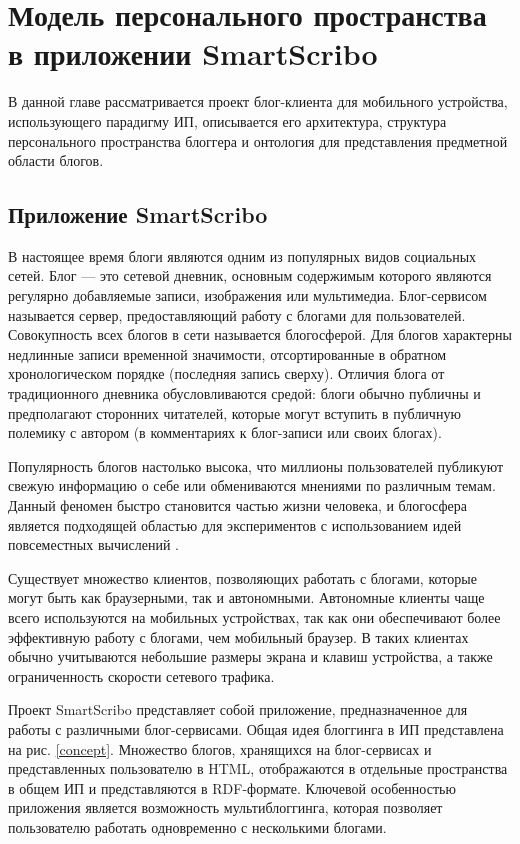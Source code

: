 \chapter{Модель персонального пространства в приложении SmartScribo}

В данной главе рассматривается проект блог-клиента для мобильного устройства, использующего
парадигму ИП, описывается его архитектура, структура персонального пространства
блоггера и онтология для представления предметной области блогов.

\section{Приложение SmartScribo}

В настоящее время блоги являются одним из популярных видов социальных сетей. Блог --- это сетевой дневник, основным содержимым которого являются регулярно добавляемые записи, изображения или мультимедиа. Блог-сервисом называется сервер, предоставляющий работу с блогами для пользователей. Совокупность всех блогов в сети называется блогосферой. Для блогов характерны недлинные записи временной значимости, отсортированные в обратном хронологическом порядке (последняя запись сверху). Отличия блога от традиционного дневника обусловливаются средой: блоги обычно публичны и предполагают сторонних читателей, которые могут вступить в публичную полемику с автором (в комментариях к блог-записи или своих блогах).

Популярность блогов настолько высока, что миллионы пользователей публикуют свежую информацию о себе или обмениваются мнениями по различным темам. Данный феномен быстро становится частью жизни человека, и блогосфера является подходящей областью для экспериментов с использованием идей повсеместных вычислений \cite{karger:what,benson:talking}.

Существует множество клиентов, позволяющих работать с блогами, которые могут быть как браузерными, так и автономными. Автономные клиенты чаще всего используются на мобильных
устройствах, так как они обеспечивают более эффективную работу с блогами, чем мобильный браузер.
В таких клиентах обычно учитываются небольшие размеры экрана и клавиш устройства, а также ограниченность скорости сетевого трафика.

Проект SmartScribo \cite{smartscribo-old, smartscribo} представляет собой приложение, предназначенное для работы с различными блог-сервисами. Общая идея блоггинга в ИП представлена на рис. \ref{concept}. Множество блогов, хранящихся на блог-сервисах и представленных пользователю в HTML, отображаются в отдельные пространства в общем ИП и представляются в RDF-формате. Ключевой особенностью приложения является возможность мультиблоггинга,
которая позволяет пользователю работать одновременно с несколькими блогами.


